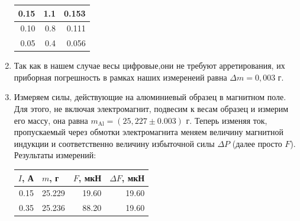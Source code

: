\documentclass[a4paper,12pt]{extarticle}
\def\Slope{1.5}
\def\Intercept{-20}
\begin{document}
\begin{enumerate}
\begin{minipage}{0.3\textwidth}
\begin{tabular}{|r|r|r|}
    0.15                          & 1.1                              & 0.153                        \\ \hline
    0.10                          & 0.8                              & 0.111                        \\ \hline
    0.05                          & 0.4                              & 0.056                        \\ \hline
    \end{tabular}
    \end{minipage}
    \begin{minipage}{0.7\linewidth}
    \end{minipage}
    \newpage
    \item Так как в нашем случае весы цифровые,они не требуют арретирования, их приборная погрешность в рамках наших измеренеий равна $\Delta m = 0,003$ г.
    \item Измеряем силы, действующие на алюминиевый образец в магнитном поле. Для этого, не включая электромагнит, подвесим к весам образец и измерим его массу, она равна $m_{\text{Al}} = (25,227\pm0.003)$ г. Теперь изменяя ток, пропускаемый через обмотки электромагнита меняем величину магнитной индукции и соответственно величину избыточной силы $\Delta P$ (далее просто $F$). \\ Результаты измерений:
    \begin{tabular}{|r|r|r|r|}
    \hline
    \multicolumn{1}{|l|}{$I$, А} & \multicolumn{1}{l|}{$m$, г} & \multicolumn{1}{l|}{$F$, мкН} & \multicolumn{1}{l|}{$\Delta F$, мкН} \\ \hline
    0.15 & 25.229 & 19.60  & 19.60 \\ \hline
    0.35 & 25.236 & 88.20  & 19.60 \\ \hline

\end{tabular}
\end{enumerate}
\end{document}
